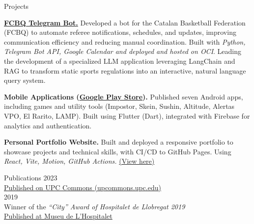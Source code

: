 \documentclass{resume} %
\newcommand\spaceBetween{-0.3}
\begin{document}
\newpage
\begin{rSection}{Projects}
\vspace{-1.0em}
\item \href{https://t.me/FCBQbot}{\textbf{FCBQ Telegram Bot.}} Developed a bot for the Catalan Basketball Federation (FCBQ) to automate referee notifications, schedules, and updates, improving communication efficiency and reducing manual coordination. Built with \textit{Python, Telegram Bot API, Google Calendar and deployed and hosted on OCI}. Leading the development of a specialized LLM application leveraging LangChain and RAG to transform static sports regulations into an interactive, natural language query system.

\item \textbf{Mobile Applications (\href{https://play.google.com/store/apps/dev?id=7628959347884936338}{Google Play Store}).} Published seven Android apps, including games and utility tools (Impostor, Skein, Sushin, Altitude, Alertas VPO, El Rarito, LAMP). Built using Flutter (Dart), integrated with Firebase for analytics and authentication.

\item \textbf{Personal Portfolio Website.} Built and deployed a responsive portfolio to showcase projects and technical skills, with CI/CD to GitHub Pages. Using \textit{React, Vite, Motion, GitHub Actions.} \href{https://victor-asenjo.github.io/}{(View here)}

\end{rSection}

\vspace{\spaceBetween em}
\begin{rSection}{Publications}
 \hfill 2023 \\
\href{https://upcommons.upc.edu/handle/2117/394198}{Published on UPC Commons (upcommons.upc.edu)} \\[4pt]
 \hfill 2019 \\
Winner of the \textit{“City” Award of Hospitalet de Llobregat 2019} \\
\href{http://www.museul-h.cat/detallCataleg.aspx?1jj5gAdUHadUSBLlOTKvqazAvixYO5e8c9sIJ3EJZPqazAQysMqazB}{Published at Museu de L’Hospitalet}
\end{rSection}
\end{document}
